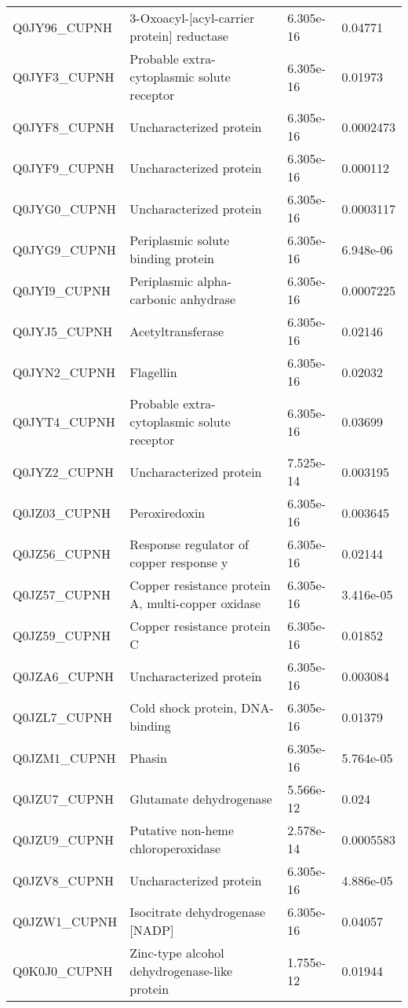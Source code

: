 \begin{center}
\begin{longtable}{ l l l l }
Q0JY96\_CUPNH & 3-Oxoacyl-[acyl-carrier protein] reductase& 6.305e-16 & 0.04771 \\ [0.5ex]
Q0JYF3\_CUPNH & Probable extra-cytoplasmic solute receptor& 6.305e-16 & 0.01973 \\ [0.5ex]
Q0JYF8\_CUPNH & Uncharacterized protein& 6.305e-16 & 0.0002473 \\ [0.5ex]
Q0JYF9\_CUPNH & Uncharacterized protein& 6.305e-16 & 0.000112 \\ [0.5ex]
Q0JYG0\_CUPNH & Uncharacterized protein& 6.305e-16 & 0.0003117 \\ [0.5ex]
Q0JYG9\_CUPNH & Periplasmic solute binding protein& 6.305e-16 & 6.948e-06 \\ [0.5ex]
Q0JYI9\_CUPNH & Periplasmic alpha-carbonic anhydrase& 6.305e-16 & 0.0007225 \\ [0.5ex]
Q0JYJ5\_CUPNH & Acetyltransferase& 6.305e-16 & 0.02146 \\ [0.5ex]
Q0JYN2\_CUPNH & Flagellin& 6.305e-16 & 0.02032 \\ [0.5ex]
Q0JYT4\_CUPNH & Probable extra-cytoplasmic solute receptor& 6.305e-16 & 0.03699 \\ [0.5ex]
Q0JYZ2\_CUPNH & Uncharacterized protein& 7.525e-14 & 0.003195 \\ [0.5ex]
Q0JZ03\_CUPNH & Peroxiredoxin& 6.305e-16 & 0.003645 \\ [0.5ex]
Q0JZ56\_CUPNH & Response regulator of copper response y& 6.305e-16 & 0.02144 \\ [0.5ex]
Q0JZ57\_CUPNH & Copper resistance protein A, multi-copper oxidase& 6.305e-16 & 3.416e-05 \\ [0.5ex]
Q0JZ59\_CUPNH & Copper resistance protein C& 6.305e-16 & 0.01852 \\ [0.5ex]
Q0JZA6\_CUPNH & Uncharacterized protein& 6.305e-16 & 0.003084 \\ [0.5ex]
Q0JZL7\_CUPNH & Cold shock protein, DNA-binding& 6.305e-16 & 0.01379 \\ [0.5ex]
Q0JZM1\_CUPNH & Phasin& 6.305e-16 & 5.764e-05 \\ [0.5ex]
Q0JZU7\_CUPNH & Glutamate dehydrogenase& 5.566e-12 & 0.024 \\ [0.5ex]
Q0JZU9\_CUPNH & Putative non-heme chloroperoxidase& 2.578e-14 & 0.0005583 \\ [0.5ex]
Q0JZV8\_CUPNH & Uncharacterized protein& 6.305e-16 & 4.886e-05 \\ [0.5ex]
Q0JZW1\_CUPNH & Isocitrate dehydrogenase [NADP]& 6.305e-16 & 0.04057 \\ [0.5ex]
Q0K0J0\_CUPNH & Zinc-type alcohol dehydrogenase-like protein& 1.755e-12 & 0.01944 \\ [0.5ex]

\end{longtable}
\end{center}
